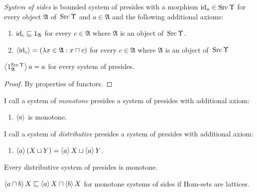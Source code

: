 \begin{defn}
\emph{System of sides} is bounded system of presides with
a morphism $\operatorname{id}_a\in\operatorname{Src}\Upsilon$ for every object $\mathfrak{A}$ of~$\operatorname{Src}\Upsilon$ and $a\in\mathfrak{A}$
and the following additional axioms:
\begin{enumerate}
  \item $\operatorname{id}_c \sqsubseteq 1_{\mathfrak{A}}$ for every $c \in \mathfrak{A}$
    where $\mathfrak{A}$ is an object of~$\operatorname{Src}\Upsilon$.

  \item $\left\langle \operatorname{id}_c\right\rangle = (\lambda x \in \mathfrak{A}: x \sqcap c)$ for every $c \in \mathfrak{A}$
    where $\mathfrak{A}$ is an object of~$\operatorname{Src}\Upsilon$
\end{enumerate}
\end{defn}

\begin{prop}
$\left\langle 1^{\operatorname{Src}\Upsilon}_\mathfrak{A}\right\rangle a = a$ for every system of presides.
\end{prop}

\begin{proof}
By properties of functors.
\end{proof}

\begin{defn}
I call a system of \emph{monotone} presides a system of presides with additional axiom:
\begin{enumerate}
\item $\left\langle a\right\rangle$ is monotone.
\end{enumerate}
\end{defn}

\begin{defn}
I call a system of \emph{distributive} presides a system of presides with additional axiom:
\begin{enumerate}
\item $\left\langle a\right\rangle(X\sqcup Y) = \left\langle a\right\rangle X\sqcup\left\langle a\right\rangle Y$.
\end{enumerate}
\end{defn}

\begin{obvious}
Every distributive system of presides is monotone.
\end{obvious}

\begin{prop}
$\left\langle a \sqcap b\right\rangle X \sqsubseteq \left\langle a\right\rangle X \sqcap \left\langle b\right\rangle X$ for monotone systems of sides
if Hom-sets are lattices.
\end{prop}


